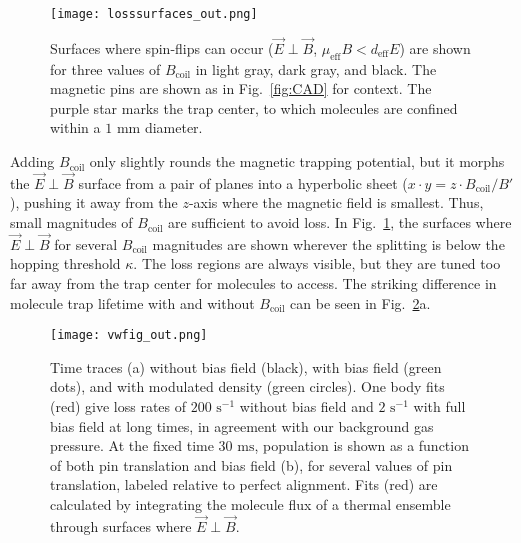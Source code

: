 \documentclass[%
 reprint,
 amsmath,amssymb,
 aps,
prl,
]{revtex4-1}
\newcommand{\bcl}{{$B_\text{coil}$}}
\newcommand{\epb}{{$\vec{E}\!\perp\!\vec{B}$}}
\begin{document}
\begin{figure}[tb]
\texttt{[image: losssurfaces\_out.png]}%
\caption{
Surfaces where spin-flips can occur (\epb{}, $\mu_\text{eff}B<d_\text{eff}E$) are shown for three values of \bcl{} in light gray, dark gray, and black. 
The magnetic pins are shown as in Fig.~\ref{fig:CAD} for context. 
The purple star marks the trap center, to which molecules are confined within a \raisebox{2.5px}{\texttildelow} $\!\!1\text{ mm}$ diameter.
}
\label{fig:LSurfs}
\end{figure}

Adding \bcl{} only slightly rounds the magnetic trapping potential, but it morphs the \epb{} surface from a pair of planes into a hyperbolic sheet ($x\cdot y= z\cdot B_\text{coil}/B'$), pushing it away from the $z$-axis where the magnetic field is smallest. 
Thus, small magnitudes of \bcl{} are sufficient to avoid loss. 
In Fig.~\ref{fig:LSurfs}, the surfaces where \epb{} for several \bcl{} magnitudes are shown wherever the splitting is below the hopping threshold $\kappa$. 
The loss regions are always visible, but they are tuned too far away from the trap center for molecules to access. 
The striking difference in molecule trap lifetime with and without \bcl{} can be seen in Fig.~\ref{fig:WVplot}a.

\begin{figure}[tb]
\texttt{[image: vwfig\_out.png]}%
\caption{
Time traces (a) without bias field (black), with bias field (green dots), and with modulated density (green circles). 
One body fits (red) give loss rates of $200\text{ s}^{-1}$ without bias field and $2\text{ s}^{-1}$ with full bias field at long times, in agreement with our background gas pressure. 
At the fixed time $30\text{ ms}$, population is shown as a function of both pin translation and bias field (b), for several values of pin translation, labeled relative to perfect alignment. 
Fits (red) are calculated by integrating the molecule flux of a thermal ensemble through surfaces where \epb.
\label{fig:WVplot}}
\end{figure}

\end{document}
